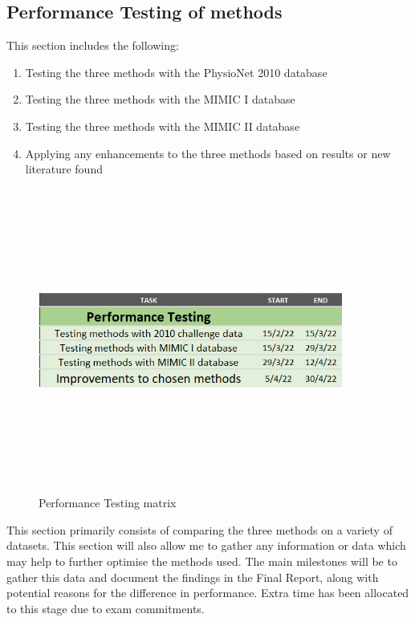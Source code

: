 \documentclass[11pt, a4paper]{article}
\begin{document}
\subsection{Performance Testing of methods}
This section includes the following:
\begin{enumerate}
    \item Testing the three methods with the PhysioNet 2010 database \cite{challenge2010}
    \item Testing the three methods with the MIMIC I database
    \item Testing the three methods with the MIMIC II database
    \item Applying any enhancements to the three methods based on results or new literature found
\end{enumerate}\begin{figure}[H]
    \centering
    \includegraphics[width=10cm,height=10cm,keepaspectratio]{Figures/part3_gantt.png}
    \caption{Performance Testing matrix}
    \label{gantt3}
\end{figure} \noindent This section primarily consists of comparing the three methods on a variety of datasets. This section will also allow me to gather any information or data which may help to further optimise the methods used. The main milestones will be to gather this data and document the findings in the Final Report, along with potential reasons for the difference in performance. Extra time has been allocated to this stage due to exam commitments.
\newpage
\end{document}
